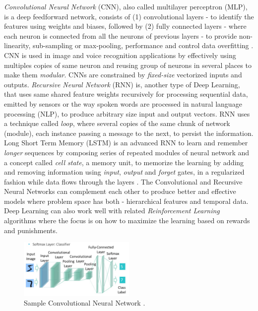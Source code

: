 \documentclass[sigconf]{acmart}
\begin{document}
	{\em Convolutional Neural Network} (CNN), also called multilayer perceptron (MLP), is a deep feedforward network, consists of (1) convolutional layers - to identify the features using weights and biases, followed by (2) fully connected layers - where each neuron is connected from all the neurons of previous layers - to provide non-linearity, sub-sampling or max-pooling, performance and control data overfitting \cite{ChristopherOlah2014}. CNN is used in image and voice recognition applications by effectively using multiples copies of same neuron and reusing group of neurons in several places to make them {\em modular}. CNNs are constrained by {\em fixed-size} vectorized inputs and outputs. {\em Recursive Neural Network} (RNN) is, another type of Deep Learning, that uses same shared feature weights recursively for processing sequential data, emitted by sensors or the way spoken words are processed in natural language processing (NLP), to produce arbitrary size input and output vectors. RNN uses a technique called {\em loop}, where several copies of the same chunk of network (module), each instance passing a message to the next, to persist the information. Long Short Term Memory (LSTM) is an advanced RNN to learn and remember {\em longer} sequences by composing series of repeated modules of neural network and a concept called {\em cell state}, a memory unit, to memorize the learning by adding and removing information using {\em input}, {\em output} and {\em forget} gates, in a regularized fashion while data flows through the layers \cite{Olah2015}. The Convolutional and Recursive Neural Networks can complement each other to produce better and effective models where problem space has both - hierarchical features and temporal data. Deep Learning can also work well with related {\em Reinforcement Learning} algorithms where the focus is on how to maximize the learning based on rewards and punishments.	

	\begin{figure}
		\centering
		\includegraphics[width=0.5\textwidth]{images/cnn}
		\caption{Sample Convolutional Neural Network \cite{Chang2016}.} \label{fig:figure3} 
	\end{figure}
\end{document}
